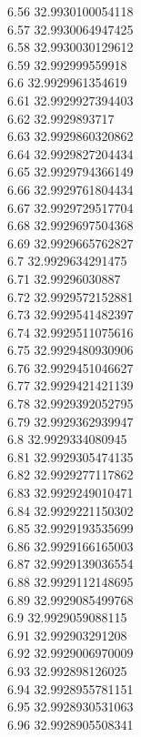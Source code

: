 {6.56	32.9930100054118\\
6.57	32.9930064947425\\
6.58	32.9930030129612\\
6.59	32.992999559918\\
6.6	32.9929961354619\\
6.61	32.9929927394403\\
6.62	32.9929893717\\
6.63	32.9929860320862\\
6.64	32.9929827204434\\
6.65	32.9929794366149\\
6.66	32.9929761804434\\
6.67	32.9929729517704\\
6.68	32.9929697504368\\
6.69	32.9929665762827\\
6.7	32.9929634291475\\
6.71	32.99296030887\\
6.72	32.9929572152881\\
6.73	32.9929541482397\\
6.74	32.9929511075616\\
6.75	32.9929480930906\\
6.76	32.9929451046627\\
6.77	32.9929421421139\\
6.78	32.9929392052795\\
6.79	32.9929362939947\\
6.8	32.9929334080945\\
6.81	32.9929305474135\\
6.82	32.9929277117862\\
6.83	32.9929249010471\\
6.84	32.9929221150302\\
6.85	32.9929193535699\\
6.86	32.9929166165003\\
6.87	32.9929139036554\\
6.88	32.9929112148695\\
6.89	32.9929085499768\\
6.9	32.9929059088115\\
6.91	32.992903291208\\
6.92	32.9929006970009\\
6.93	32.992898126025\\
6.94	32.9928955781151\\
6.95	32.9928930531063\\
6.96	32.9928905508341\\
}
